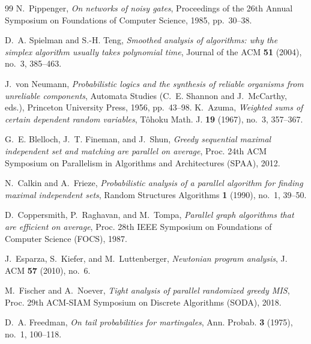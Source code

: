 \documentclass[11pt]{amsart}
\theoremstyle{definition}
\theoremstyle{remark}
\begin{document}
\begin{thebibliography}{99}
N.~Pippenger, \emph{On networks of noisy gates}, Proceedings of the 26th
Annual Symposium on Foundations of Computer Science, 1985, pp.~30--38.

D.~A. Spielman and S.-H. Teng, \emph{Smoothed analysis of algorithms: why the
simplex algorithm usually takes polynomial time}, Journal of the ACM
\textbf{51} (2004), no.~3, 385--463.

J.~von Neumann, \emph{Probabilistic logics and the synthesis of reliable
organisms from unreliable components}, Automata Studies (C.~E. Shannon and
J.~McCarthy, eds.), Princeton University Press, 1956, pp.~43--98.
K.~Azuma, \emph{Weighted sums of certain dependent random variables},
T\^ohoku Math. J. \textbf{19} (1967), no.~3, 357--367.

G.~E. Blelloch, J.~T. Fineman, and J.~Shun, \emph{Greedy sequential maximal
independent set and matching are parallel on average}, Proc. 24th ACM
Symposium on Parallelism in Algorithms and Architectures (SPAA), 2012.

N.~Calkin and A.~Frieze, \emph{Probabilistic analysis of a parallel algorithm
for finding maximal independent sets}, Random Structures Algorithms
\textbf{1} (1990), no.~1, 39--50.

D.~Coppersmith, P.~Raghavan, and M.~Tompa, \emph{Parallel graph algorithms
that are efficient on average}, Proc. 28th IEEE Symposium on Foundations of
Computer Science (FOCS), 1987.

J.~Esparza, S.~Kiefer, and M.~Luttenberger, \emph{Newtonian program analysis},
J. ACM \textbf{57} (2010), no.~6.

M.~Fischer and A.~Noever, \emph{Tight analysis of parallel randomized greedy
MIS}, Proc. 29th ACM-SIAM Symposium on Discrete Algorithms (SODA), 2018.

D.~A. Freedman, \emph{On tail probabilities for martingales}, Ann. Probab.
\textbf{3} (1975), no.~1, 100--118.

\end{thebibliography}
\end{document}
